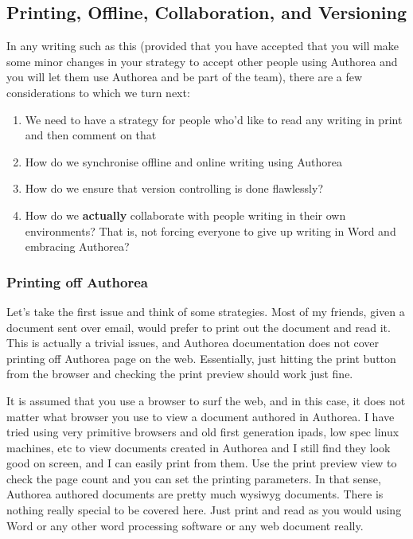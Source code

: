 \subsection{Printing, Offline, Collaboration, and Versioning}

In any writing such as this (provided that you have accepted that you will make some minor changes in your strategy to accept other people using Authorea and you will let them use Authorea and be part of the team), there are a few considerations to which we turn next:

\begin{enumerate}
\item We need to have a strategy for people who'd like to read any writing in print and then comment on that
\item How do we synchronise offline and online writing using Authorea
\item How do we ensure that version controlling is done flawlessly?
\item How do we \textbf{actually} collaborate with people writing in their own environments? That is, not forcing everyone to give up writing in Word and embracing Authorea?
\end{enumerate}

\subsubsection{Printing off Authorea}

Let's take the first issue and think of some strategies. Most of my friends, given a document sent over email, would prefer to print out the document and read it. This is actually a trivial issues, and Authorea documentation does not cover printing off Authorea page on the web. Essentially, just hitting the print button from the browser and checking the print preview should work just fine. 

It is assumed that you use a browser to surf the web, and in this case, it does not matter what browser you use to view a document authored in Authorea. I have tried using very primitive browsers and old first generation ipads, low spec linux machines, etc to view documents created in Authorea and I still find they look good on screen, and I can easily print from them. Use the print preview view to check the page count and you can set the printing parameters. In that sense, Authorea authored documents are pretty much wysiwyg documents. There is nothing really special to be covered here. Just print and read as you would using Word or any other word processing software or any web document really. 

